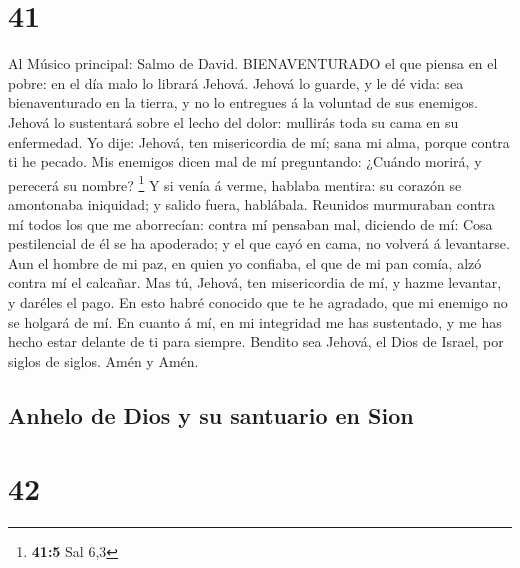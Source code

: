 \hypertarget{section-40}{%
\section{41}\label{section-40}}

 Al Músico principal: Salmo de David. BIENAVENTURADO el que
piensa en el pobre: en el día malo lo librará Jehová. 
Jehová lo guarde, y le dé vida: sea bienaventurado en la tierra, y no lo
entregues á la voluntad de sus enemigos.  Jehová lo
sustentará sobre el lecho del dolor: mullirás toda su cama en su
enfermedad.  Yo dije: Jehová, ten misericordia de mí; sana
mi alma, porque contra ti he pecado.  Mis enemigos dicen mal
de mí preguntando: ¿Cuándo morirá, y perecerá su nombre? \footnote{\textbf{41:5}
  Sal 6,3}  Y si venía á verme, hablaba mentira: su corazón
se amontonaba iniquidad; y salido fuera, hablábala. 
Reunidos murmuraban contra mí todos los que me aborrecían: contra mí
pensaban mal, diciendo de mí:  Cosa pestilencial de él se ha
apoderado; y el que cayó en cama, no volverá á levantarse. 
Aun el hombre de mi paz, en quien yo confiaba, el que de mi pan comía,
alzó contra mí el calcañar.  Mas tú, Jehová, ten
misericordia de mí, y hazme levantar, y daréles el pago. 
En esto habré conocido que te he agradado, que mi enemigo no se holgará
de mí.  En cuanto á mí, en mi integridad me has sustentado,
y me has hecho estar delante de ti para siempre.  Bendito
sea Jehová, el Dios de Israel, por siglos de siglos. Amén y Amén.

\hypertarget{anhelo-de-dios-y-su-santuario-en-sion}{%
\subsection{Anhelo de Dios y su santuario en
Sion}\label{anhelo-de-dios-y-su-santuario-en-sion}}

\hypertarget{section-41}{%
\section{42}\label{section-41}}

